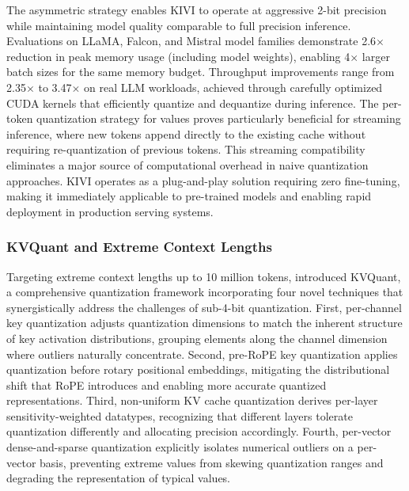 \documentclass[11pt,letterpaper]{article}
\begin{document}
The asymmetric strategy enables KIVI to operate at aggressive 2-bit precision while maintaining model quality comparable to full precision inference. Evaluations on LLaMA, Falcon, and Mistral model families demonstrate 2.6$\times$ reduction in peak memory usage (including model weights), enabling 4$\times$ larger batch sizes for the same memory budget. Throughput improvements range from 2.35$\times$ to 3.47$\times$ on real LLM workloads, achieved through carefully optimized CUDA kernels that efficiently quantize and dequantize during inference. The per-token quantization strategy for values proves particularly beneficial for streaming inference, where new tokens append directly to the existing cache without requiring re-quantization of previous tokens. This streaming compatibility eliminates a major source of computational overhead in naive quantization approaches. KIVI operates as a plug-and-play solution requiring zero fine-tuning, making it immediately applicable to pre-trained models and enabling rapid deployment in production serving systems.

\subsubsection{KVQuant and Extreme Context Lengths}

Targeting extreme context lengths up to 10 million tokens, \cite{hooper2024kvquant} introduced KVQuant, a comprehensive quantization framework incorporating four novel techniques that synergistically address the challenges of sub-4-bit quantization. First, per-channel key quantization adjusts quantization dimensions to match the inherent structure of key activation distributions, grouping elements along the channel dimension where outliers naturally concentrate. Second, pre-RoPE key quantization applies quantization before rotary positional embeddings, mitigating the distributional shift that RoPE introduces and enabling more accurate quantized representations. Third, non-uniform KV cache quantization derives per-layer sensitivity-weighted datatypes, recognizing that different layers tolerate quantization differently and allocating precision accordingly. Fourth, per-vector dense-and-sparse quantization explicitly isolates numerical outliers on a per-vector basis, preventing extreme values from skewing quantization ranges and degrading the representation of typical values.
\end{document}
